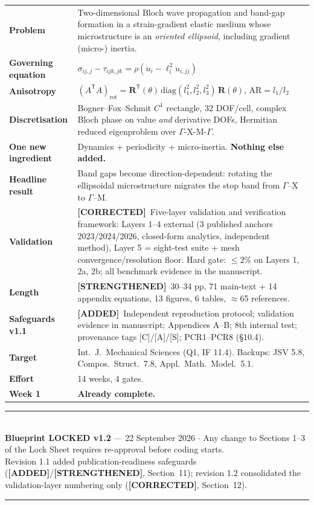 \documentclass[11pt,a4paper]{article}
\newcommand{\ADDED}{{\color{addcol}\textbf{[ADDED]}}}
\newcommand{\STR}{{\color{strcol}\textbf{[STRENGTHENED]}}}
\newcommand{\COR}{{\color{corcol}\textbf{[CORRECTED]}}}
\begin{document}
\begin{xltabular}{\textwidth}{@{}L{3.3cm} Y@{}}
\textbf{Problem} & Two-dimensional Bloch wave propagation and band-gap formation in a strain-gradient elastic medium whose microstructure is an \emph{oriented ellipsoid}, including gradient (micro-) inertia. \\
\textbf{Governing equation} & $\sigma_{ij,j}-\tau_{ijk,jk}=\rho\left(\ddot u_i-\ell_{\mathrm i}^2\ddot u_{i,jj}\right)$ \\
\textbf{Anisotropy} & $(A^{\mathsf T}\!A)_{\mathrm{rot}}=\bm R^{\mathsf T}(\theta)\,\mathrm{diag}(l_1^2,l_2^2,l_3^2)\,\bm R(\theta)$, \quad $\mathrm{AR}=l_1/l_2$ \\
\textbf{Discretisation} & Bogner--Fox--Schmit $C^1$ rectangle, 32 DOF/cell, complex Bloch phase on value \emph{and} derivative DOFs, Hermitian reduced eigenproblem over $\Gamma$-X-M-$\Gamma$. \\
\textbf{One new ingredient} & Dynamics + periodicity + micro-inertia. \textbf{Nothing else added.} \\
\textbf{Headline result} & Band gaps become direction-dependent: rotating the ellipsoidal microstructure migrates the stop band from $\Gamma$--X to $\Gamma$--M. \\
\textbf{Validation} & \COR\ Five-layer validation and verification framework: Layers 1--4 external (3 published anchors 2023/2024/2026, closed-form analytics, independent method), Layer 5 = eight-test suite + mesh convergence/resolution floor. Hard gate: $\le2\%$ on Layers 1, 2a, 2b; all benchmark evidence in the manuscript. \\
\textbf{Length} & \STR\ 30--34 pp, 71 main-text + 14 appendix equations, 13 figures, 6 tables, $\approx$65 references. \\
\textbf{Safeguards v1.1} & \ADDED\ Independent reproduction protocol; validation evidence in manuscript; Appendices A--B; 8th internal test; provenance tags [C]/[A]/[S]; PCR1--PCR8 (\S10.4). \\
\textbf{Target} & Int.\ J.\ Mechanical Sciences (Q1, IF 11.4). Backups: JSV 5.8, Compos.\ Struct.\ 7.8, Appl.\ Math.\ Model.\ 5.1. \\
\textbf{Effort} & 14 weeks, 4 gates. \\
\textbf{Week 1} & \textcolor{ok}{\textbf{Already complete.}} \\
\end{xltabular}

\vspace{0.4cm}
\begin{center}
{\color{accent}\rule{0.85\textwidth}{0.8pt}}\\[0.3cm]
{\footnotesize \textbf{Blueprint LOCKED v1.2} --- 22 September 2026 \quad$\cdot$\quad
Any change to Sections 1--3 of the Lock Sheet requires re-approval before coding starts.\\[0.1cm]
Revision 1.1 added publication-readiness safeguards (\ADDED/\STR, Section~11); revision 1.2 consolidated the validation-layer numbering only (\COR, Section~12).}\\[0.2cm]
{\color{accent}\rule{0.85\textwidth}{0.8pt}}
\end{center}
\end{document}
